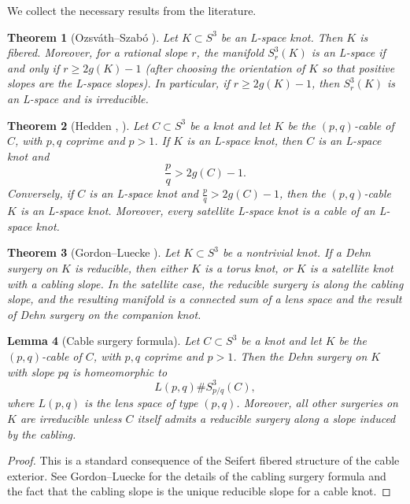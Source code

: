\documentclass[11pt]{article}
\newtheorem{theorem}{Theorem}[section]
\newtheorem{lemma}[theorem]{Lemma}
\begin{document}
We collect the necessary results from the literature.

\begin{theorem}[Ozsváth--Szabó {\cite[Theorem 1.1]{OS2011}}]\label{thm:OS-Lspace}
Let \(K \subset S^3\) be an L-space knot. Then \(K\) is fibered. Moreover, for a rational slope \(r\), the manifold \(S^3_r(K)\) is an L-space if and only if \(r \ge 2g(K)-1\) (after choosing the orientation of \(K\) so that positive slopes are the L-space slopes). In particular, if \(r \ge 2g(K)-1\), then \(S^3_r(K)\) is an L-space and is irreducible.
\end{theorem}

\begin{theorem}[Hedden {\cite[Theorem 1.1]{Hedden2005}, \cite[Theorem 1.1]{Hedden2009}}]\label{thm:Hedden-cable}
Let \(C \subset S^3\) be a knot and let \(K\) be the \((p,q)\)-cable of \(C\), with \(p,q\) coprime and \(p>1\). If \(K\) is an L-space knot, then \(C\) is an L-space knot and
\[
\frac{p}{q} > 2g(C)-1.
\]
Conversely, if \(C\) is an L-space knot and \(\frac{p}{q} > 2g(C)-1\), then the \((p,q)\)-cable \(K\) is an L-space knot. Moreover, every satellite L-space knot is a cable of an L-space knot.
\end{theorem}

\begin{theorem}[Gordon--Luecke {\cite[Theorem 1.1]{GL1996}}]\label{thm:GL}
Let \(K \subset S^3\) be a nontrivial knot. If a Dehn surgery on \(K\) is reducible, then either \(K\) is a torus knot, or \(K\) is a satellite knot with a cabling slope. In the satellite case, the reducible surgery is along the cabling slope, and the resulting manifold is a connected sum of a lens space and the result of Dehn surgery on the companion knot.
\end{theorem}

\begin{lemma}[Cable surgery formula]\label{lem:cable-formula}
Let \(C \subset S^3\) be a knot and let \(K\) be the \((p,q)\)-cable of \(C\), with \(p,q\) coprime and \(p>1\). Then the Dehn surgery on \(K\) with slope \(pq\) is homeomorphic to
\[
L(p,q) \# S^3_{p/q}(C),
\]
where \(L(p,q)\) is the lens space of type \((p,q)\). Moreover, all other surgeries on \(K\) are irreducible unless \(C\) itself admits a reducible surgery along a slope induced by the cabling.
\end{lemma}

\begin{proof}
This is a standard consequence of the Seifert fibered structure of the cable exterior. See Gordon--Luecke \cite[Section 3]{GL1996} for the details of the cabling surgery formula and the fact that the cabling slope is the unique reducible slope for a cable knot.
\end{proof}
\end{document}
